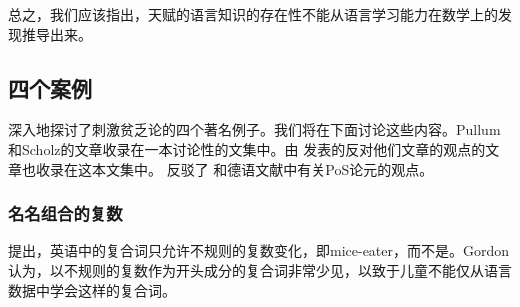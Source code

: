 总之，我们应该指出，天赋的语言知识的存在性不能从语言学习能力在数学上的发现推导出来。 

\subsection{四个案例}
\label{PSA-cases}

\mbox{} \citet{PS2002a}深入地探讨了刺激贫乏论的四个著名例子。我们将在下面讨论这些内容。Pullum和Scholz的文章收录在一本讨论性的文集中。由 \citet{SP2002b}发表的反对他们文章的观点的文章也收录在这本文集中。 \citet{Eisenberg92b}反驳了 \citet{Chomsky86}和德语文献中有关PoS论元的观点。

\subsubsection{名名组合的复数}

\mbox{} \citet{Gordon86a}提出，英语中的复合词只允许不规则的复数变化，即mice-eater，而不是。Gordon认为，以不规则的复数作为开头成分的复合词非常少见，以致于儿童不能仅从语言数据中学会这样的复合词。

